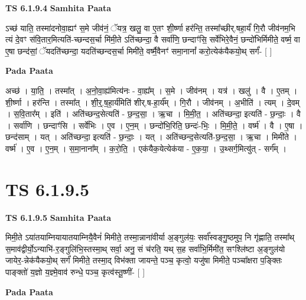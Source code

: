 \documentclass[17pt]{extarticle}
\begin{document}
\textbf{TS 6.1.9.4 } \newline
\textbf{Samhita Paata} \newline

ऽच्छ॑ याति॒ तस्मा॑दनोवा॒ह्यꣳ॑ स॒मे जीव॑नं॒ ॅयत्र॒ खलु॒ वा ए॒तꣳ शी॒र्ष्णा हर॑न्ति॒ तस्मा᳚च्छीर्.षहा॒र्यं॑ गि॒रौ जीव॑नम॒भि त्यं दे॒वꣳ स॑वि॒तार॒मित्यति॑-च्छन्दस॒र्चा मि॑मी॒ते ऽति॑च्छन्दा॒ वै सर्वा॑णि॒ छन्दाꣳ॑सि॒ सर्वे॑भिरे॒वैनं॒ छन्दो॑भिर्मिमीते॒ वर्ष्म॒ वा ए॒षा छन्द॑सां॒ ॅयदति॑च्छन्दा॒ यदति॑च्छन्दस॒र्चा मिमी॑ते॒ वर्ष्मै॒वैनꣳ॑ समा॒नानां᳚ करो॒त्येक॑यैकयो॒थ् सर्गं॑- [  ] \newline

\textbf{Pada Paata} \newline

अच्छ॑ । या॒ति॒ । तस्मा᳚त् । अ॒नो॒वा॒ह्य॑मित्य॑नः - वा॒ह्य᳚म् । स॒मे । जीव॑नम् । यत्र॑ । खलु॑ । वै । ए॒तम् । शी॒र्ष्णा । हर॑न्ति । तस्मा᳚त् । शी॒र्॒.ष॒हा॒र्य॑मिति॑ शीर्.ष-हा॒र्य᳚म् । गि॒रौ । जीव॑नम् । अ॒भीति॑ । त्यम् । दे॒वम् । स॒वि॒तार᳚म् । इति॑ । अति॑च्छन्द॒सेत्यति॑ - छ॒न्द॒सा॒ । ऋ॒चा । मि॒मी॒त॒ । अति॑च्छन्दा॒ इत्यति॑ - छ॒न्दाः॒ । वै । सर्वा॑णि । छन्दाꣳ॑सि । सर्वे॑भिः । ए॒व । ए॒न॒म् । छन्दो॑भि॒रिति॒ छन्दः॑-भिः॒ । मि॒मी॒ते॒ । वर्ष्म॑ । वै । ए॒षा । छन्द॑साम् । यत् । अति॑च्छन्दा॒ इत्यति॑ - छ॒न्दाः॒ । यत् । अति॑च्छन्द॒सेत्यति॑-छ॒न्द॒सा॒ । ऋ॒चा । मिमी॑ते । वर्ष्म॑ । ए॒व । ए॒न॒म् । स॒मा॒नाना᳚म् । क॒रो॒ति॒ । एक॑यैक॒येत्येक॑या - ए॒क॒या॒ । उ॒थ्सर्ग॒मित्यु॑त् - सर्ग᳚म् ।  \newline





\section{ TS 6.1.9.5 }

\textbf{TS 6.1.9.5 } \newline
\textbf{Samhita Paata} \newline

मिमी॒ते ऽया॑तयाम्नियायातयाम्नियै॒वैनं॑ मिमीते॒ तस्मा॒न्नाना॑वीर्या अ॒ङ्गुल॑यः॒ सर्वा᳚स्वङ्गु॒ष्ठमुप॒ नि गृ॑ह्णाति॒ तस्मा᳚थ् स॒माव॑द्वीर्यो॒ऽन्याभि॑-र॒ङ्गुलि॑भि॒स्तस्मा॒थ् सर्वा॒ अनु॒ सं च॑रति॒ यथ् स॒ह सर्वा॑भि॒र्मिमी॑त॒ सꣳश्लि॑ष्टा अ॒ङ्गुल॑यो जायेर॒-न्नेक॑यैकयो॒थ् सर्गं॑ मिमीते॒ तस्मा॒द् विभ॑क्ता जायन्ते॒ पञ्च॒ कृत्वो॒ यजु॑षा मिमीते॒ पञ्चा᳚क्षरा प॒ङ्क्तिः पाङ्क्तो॑ य॒ज्ञो य॒ज्ञ्मे॒वाव॑ रुन्धे॒ पञ्च॒ कृत्व॑स्तू॒ष्णीं- [  ] \newline

\textbf{Pada Paata} \newline
\end{document}
